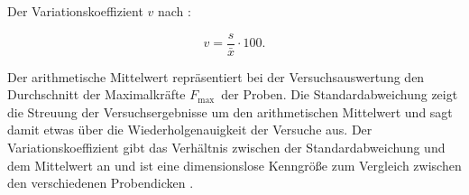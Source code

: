 Der Variationskoeffizient $v$ nach  \cite[Seite 29]{Statistik2018}:

    \begin{equation}\label{eq:Variationskoeffizient}
   v = \frac{s}{\bar{x}} \cdot 100.
    \end{equation}
     
Der arithmetische Mittelwert repräsentiert bei der Versuchsauswertung den Durchschnitt der Maximalkräfte $F_{\text{max}}$~der Proben. Die Standardabweichung zeigt die Streuung der Versuchsergebnisse um den arithmetischen Mittelwert und sagt damit etwas über die Wiederholgenauigkeit der Versuche aus. Der Variationskoeffizient gibt das Verhältnis zwischen der Standardabweichung und dem Mittelwert an und ist eine dimensionslose Kenngröße zum Vergleich zwischen den verschiedenen Probendicken \cite[Seite 23--29]{Statistik2018}. 